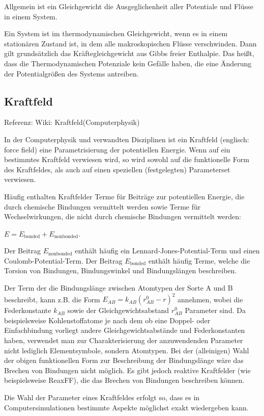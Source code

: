 \documentclass[]{article}
\begin{document}
Allgemein ist ein Gleichgewicht die Ausgeglichenheit aller Potentiale und Flüsse in einem System.
 
Ein System ist im thermodynamischen Gleichgewicht, wenn es in einem stationären Zustand ist, in dem alle makroskopischen Flüsse verschwinden. Dann gilt grundsätzlich das Kräftegleichgewicht aus Gibbs freier Enthalpie. Das heißt, dass die Thermodynamischen Potenziale kein Gefälle haben, die eine Änderung der Potentialgrößen des Systems antreiben.

\subsection{Kraftfeld}
Referenz: Wiki: Kraftfeld(Computerphysik)

In der Computerphysik und verwandten Disziplinen ist ein Kraftfeld (englisch: force field) eine Parametrisierung der potentiellen Energie. Wenn auf ein bestimmtes Kraftfeld verwiesen wird, so wird sowohl auf die funktionelle Form des Kraftfeldes, als auch auf einen speziellen (festgelegten) Parameterset verwiesen.

Häufig enthalten Kraftfelder Terme für Beiträge zur potentiellen Energie, die durch chemische Bindungen vermittelt werden sowie Terme für Wechselwirkungen, die nicht durch chemische Bindungen vermittelt werden:

$E=E_\text{bonded}+E_\text{nonbonded}$.

Der Beitrag $E_\text{nonbonded}$ enthält häufig ein Lennard-Jones-Potential-Term und einen Coulomb-Potential-Term. Der Beitrag $E_\text{bonded}$ enthält häufig Terme, welche die Torsion von Bindungen, Bindungswinkel und Bindungslängen beschreiben.

Der Term der die Bindungslänge zwischen Atomtypen der Sorte A und B beschreibt, kann z.B. die Form $E_{AB} = k_{AB} (r_{AB}^0 - r)^2$ annehmen, wobei die Federkonstante $k_{AB}$ sowie der Gleichgewichtsabstand $r_{AB}^0$ Parameter sind. Da beispielsweise Kohlenstoffatome je nach dem ob eine Doppel- oder Einfachbindung vorliegt andere Gleichgewichtsabstände und Federkonstanten haben, verwendet man zur Charakterisierung der anzuwendenden Parameter nicht lediglich Elementsymbole, sondern Atomtypen. Bei der (alleinigen) Wahl der obigen funktionellen Form zur Beschreibung der Bindungslänge wäre das Brechen von Bindungen nicht möglich. Es gibt jedoch reaktive Kraftfelder (wie beispielsweise ReaxFF), die das Brechen von Bindungen beschreiben können.

Die Wahl der Parameter eines Kraftfeldes erfolgt so, dass es in Computersimulationen bestimmte Aspekte möglichst exakt wiedergeben kann.
\end{document}
